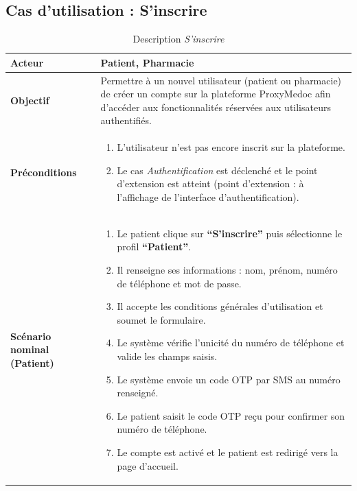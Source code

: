 \documentclass[12pt,a4paper]{report}
\begin{document}
\subsection*{Cas d'utilisation : S'inscrire}
\begin{table}[H]
    \centering
    \begin{tabular}{|p{4cm}|p{9cm}|}
        \hline
        \textbf{Acteur} & Patient, Pharmacie \\
        \hline
        \textbf{Objectif} & Permettre à un nouvel utilisateur (patient ou pharmacie) de créer un compte sur la plateforme ProxyMedoc afin d'accéder aux fonctionnalités réservées aux utilisateurs authentifiés. \\
        \hline
        \textbf{Préconditions} &
        \begin{enumerate}
            \item L'utilisateur n'est pas encore inscrit sur la plateforme.
            \item Le cas \textit{Authentification} est déclenché et le point d'extension est atteint (point d'extension : à l'affichage de l'interface d'authentification).
        \end{enumerate} \\
        \hline
        \textbf{Scénario nominal (Patient)} &
        \begin{enumerate}
            \item Le patient clique sur \textbf{``S'inscrire''} puis sélectionne le profil \textbf{``Patient''}.
            \item Il renseigne ses informations : nom, prénom, numéro de téléphone et mot de passe.
            \item Il accepte les conditions générales d'utilisation et soumet le formulaire.
            \item Le système vérifie l'unicité du numéro de téléphone et valide les champs saisis.
            \item Le système envoie un code OTP par SMS au numéro renseigné.
            \item Le patient saisit le code OTP reçu pour confirmer son numéro de téléphone.
            \item Le compte est activé et le patient est redirigé vers la page d'accueil.
        \end{enumerate} \\
        \hline
    \end{tabular}
    \caption{Description \textit{S'inscrire}}
\end{table}
\end{document}
